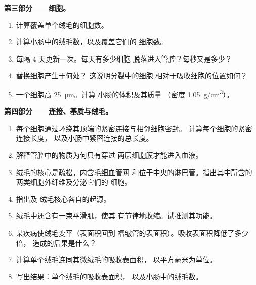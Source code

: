 \begin{problem}
\medskip
\noindent\textbf{第三部分——细胞。}
\begin{enumerate}[resume]
  \item 计算覆盖单个绒毛的细胞数。
  \item 计算小肠中的绒毛数，以及覆盖它们的
        细胞数。
  \item {}每隔 \qty{4}{} 天更新一次。每天有多少细胞
        脱落进入管腔？每秒又是多少？
  \item 替换细胞产生于何处？
        这说明分裂中的细胞
        相对于吸收细胞的位置如何？
  \item 一个细胞高 \qty{25}{\micro m}。计算
        小肠的体积及其质量
        （密度 \qty{1.05}{g/cm^3}）。
\end{enumerate}

\medskip
\noindent\textbf{第四部分——连接、基质与绒毛。}
\begin{enumerate}[resume]
  \item 每个细胞通过环绕其顶端的紧密连接与相邻细胞密封。
        计算每个细胞的紧密连接长度，
        以及小肠中紧密连接的总长度。
  \item 解释管腔中的物质为何只有穿过
        两层细胞膜才能进入血液。
  \item 绒毛的核心是疏松，内含毛细血管网
        和位于中央的淋巴管。指出其中所含的
        两类细胞外纤维及分泌它们的
        细胞。
  \item 指出及
        绒毛核心各自的起源。
  \item 绒毛中还含有一束平滑肌，使其
        有节律地收缩。试推测其功能。
  \item 某疾病使绒毛变平（表面积回到
        褶皱管的表面积）。吸收表面积降低了多少倍，
        造成的后果是什么？
  \item 计算单个绒毛连同其微绒毛的吸收表面积，
        以平方毫米为单位。
  \item 写出结果：单个绒毛的吸收表面积，
        以及小肠中的绒毛数。
\end{enumerate}
\end{problem}
